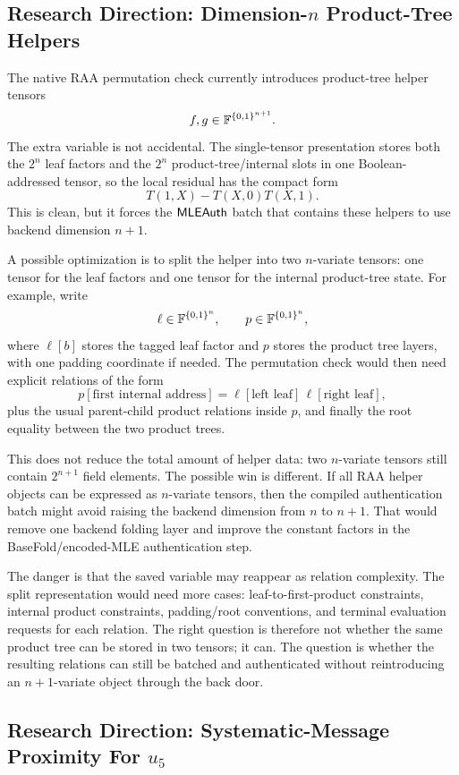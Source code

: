 \subsection{Research Direction: Dimension-\(n\) Product-Tree Helpers}

The native RAA permutation check currently introduces product-tree helper
tensors
\[
  f,g\in\mathbb{F}^{\{0,1\}^{n+1}}.
\]
The extra variable is not accidental.  The single-tensor presentation stores
both the \(2^n\) leaf factors and the \(2^n\) product-tree/internal slots in one
Boolean-addressed tensor, so the local residual has the compact form
\[
  T(1,X)-T(X,0)T(X,1).
\]
This is clean, but it forces the \(\mathsf{MLEAuth}\) batch that contains these helpers
to use backend dimension \(n+1\).

A possible optimization is to split the helper into two \(n\)-variate tensors:
one tensor for the leaf factors and one tensor for the internal product-tree
state.  For example, write
\[
  \ell\in\mathbb{F}^{\{0,1\}^n},
  \qquad
  p\in\mathbb{F}^{\{0,1\}^n},
\]
where \(\ell[b]\) stores the tagged leaf factor and \(p\) stores the product
tree layers, with one padding coordinate if needed.  The permutation check would
then need explicit relations of the form
\[
  p[\text{first internal address}]
  =
  \ell[\text{left leaf}]\,\ell[\text{right leaf}],
\]
plus the usual parent-child product relations inside \(p\), and finally the
root equality between the two product trees.

This does not reduce the total amount of helper data: two \(n\)-variate tensors
still contain \(2^{n+1}\) field elements.  The possible win is different.  If
all RAA helper objects can be expressed as \(n\)-variate tensors, then the
compiled authentication batch might avoid raising the backend dimension from
\(n\) to \(n+1\).  That would remove one backend folding layer and improve the
constant factors in the BaseFold/encoded-MLE authentication step.

The danger is that the saved variable may reappear as relation complexity.  The
split representation would need more cases: leaf-to-first-product constraints,
internal product constraints, padding/root conventions, and terminal evaluation
requests for each relation.  The right question is therefore not whether the
same product tree can be stored in two tensors; it can.  The question is whether
the resulting relations can still be batched and authenticated without
reintroducing an \(n+1\)-variate object through the back door.

\subsection{Research Direction: Systematic-Message Proximity For \(u_5\)}

